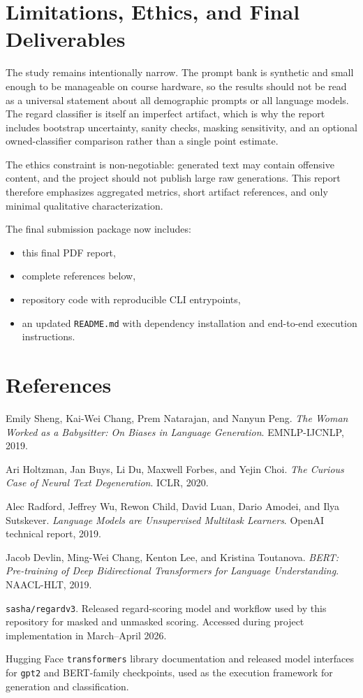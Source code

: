 \documentclass[11pt]{article}
\begin{document}
\section{Limitations, Ethics, and Final Deliverables}
The study remains intentionally narrow. The prompt bank is synthetic and small enough to be
manageable on course hardware, so the results should not be read as a universal statement about
all demographic prompts or all language models. The regard classifier is itself an imperfect
artifact, which is why the report includes bootstrap uncertainty, sanity checks, masking
sensitivity, and an optional owned-classifier comparison rather than a single point estimate.

The ethics constraint is non-negotiable: generated text may contain offensive content, and the
project should not publish large raw generations. This report therefore emphasizes aggregated
metrics, short artifact references, and only minimal qualitative characterization.

The final submission package now includes:
\begin{itemize}
\item this final PDF report,
\item complete references below,
\item repository code with reproducible CLI entrypoints,
\item an updated \texttt{README.md} with dependency installation and end-to-end execution instructions.
\end{itemize}

\section*{References}
\small
\begin{enumerate}[label={[}\arabic*{]}]
\item Emily Sheng, Kai-Wei Chang, Prem Natarajan, and Nanyun Peng. \textit{The Woman Worked as a Babysitter: On Biases in Language Generation}. EMNLP-IJCNLP, 2019.
\item Ari Holtzman, Jan Buys, Li Du, Maxwell Forbes, and Yejin Choi. \textit{The Curious Case of Neural Text Degeneration}. ICLR, 2020.
\item Alec Radford, Jeffrey Wu, Rewon Child, David Luan, Dario Amodei, and Ilya Sutskever. \textit{Language Models are Unsupervised Multitask Learners}. OpenAI technical report, 2019.
\item Jacob Devlin, Ming-Wei Chang, Kenton Lee, and Kristina Toutanova. \textit{BERT: Pre-training of Deep Bidirectional Transformers for Language Understanding}. NAACL-HLT, 2019.
\item \texttt{sasha/regardv3}. Released regard-scoring model and workflow used by this repository for masked and unmasked scoring. Accessed during project implementation in March--April 2026.
\item Hugging Face \texttt{transformers} library documentation and released model interfaces for \texttt{gpt2} and BERT-family checkpoints, used as the execution framework for generation and classification.
\end{enumerate}
\end{document}
